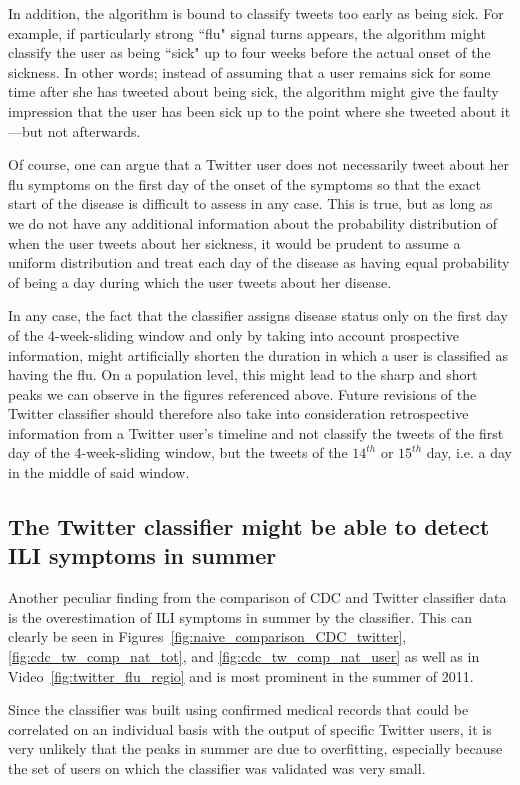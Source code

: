 \documentclass[11pt, a4paper,twoside]{report}\usepackage[]{graphicx}\usepackage[]{color}
\begin{document}
In addition, the algorithm is bound to classify tweets too early as being sick. For example, if particularly strong ``flu" signal turns appears, the algorithm might classify the user as being ``sick" up to four weeks before the actual onset of the sickness. In other words; instead of assuming that a user remains sick for some time after she has tweeted about being sick, the algorithm might give the faulty impression that the user has been sick up to the point where she tweeted about it---but not afterwards.

Of course, one can argue that a Twitter user does not necessarily tweet about her flu symptoms on the first day of the onset of the symptoms so that the exact start of the disease is difficult to assess in any case. This is true, but as long as we do not have any additional information about the probability distribution of when the user tweets about her sickness, it would be prudent to assume a uniform distribution and treat each day of the disease as having equal probability of being a day during which the user tweets about her disease. 

In any case, the fact that the classifier assigns disease status only on the first day of the 4-week-sliding window and only by taking into account prospective information, might artificially shorten the duration in which a user is classified as having the flu. On a population level, this might lead to the sharp and short peaks we can observe in the figures referenced above. Future revisions of the Twitter classifier should therefore also take into consideration retrospective information from a Twitter user's timeline and not classify the tweets of the first day of the 4-week-sliding window, but the tweets of the $14^{th}$ or $15^{th}$ day, i.e. a day in the middle of said window.

\subsection{The Twitter classifier might be able to detect ILI symptoms in summer}
Another peculiar finding from the comparison of CDC and Twitter classifier data is the overestimation of ILI symptoms in summer by the classifier. This can clearly be seen in Figures~\ref{fig:naive_comparison_CDC_twitter}, \ref{fig:cdc_tw_comp_nat_tot}, and \ref{fig:cdc_tw_comp_nat_user} as well as in Video~\ref{fig:twitter_flu_regio} and is most prominent in the summer of 2011. 

Since the classifier was built using confirmed medical records that could be correlated on an individual basis with the output of specific Twitter users, it is very unlikely that the peaks in summer are due to overfitting, especially because the set of users on which the classifier was validated was very small. 
\end{document}
